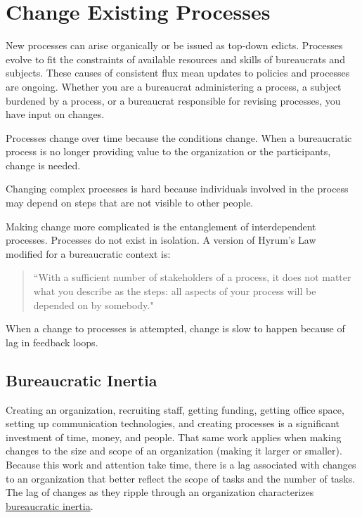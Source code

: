 \section{Change Existing Processes\label{sec:change-a-process}}

New processes can arise organically or be issued as top-down edicts. Processes evolve to fit the constraints of available resources and skills of bureaucrats and subjects. These causes of consistent flux mean updates to policies and processes are ongoing. Whether you are a bureaucrat administering a process, a subject burdened by a process, or a bureaucrat responsible for revising processes, you have input on changes.



Processes change over time because the conditions change. When a bureaucratic process is no longer providing value to the organization or the participants, change is needed. 

Changing complex processes is hard because individuals involved in the process may depend on steps that are not visible to other people.

Making change more complicated is the entanglement of interdependent processes. Processes do not exist in isolation. A version of Hyrum's Law~\cite{2017_Hyrum} 
modified for a bureaucratic context is:
\begin{quote}
``With a sufficient number of stakeholders of a process,
it does not matter what you describe as the steps:
all aspects of your process will be depended on by somebody."
\end{quote}


When  a change to processes is attempted, change is slow to happen because of lag in feedback loops. 

\subsection*{Bureaucratic Inertia}

Creating an organization, recruiting staff, getting funding, getting office space, setting up communication technologies, and creating processes is a significant investment of time, money, and people. 
That same work applies when making changes to the size and scope of an organization (making it larger or smaller). 
Because this work and attention take time, there is a lag associated with changes to an organization that better reflect the scope of tasks and the number of tasks. 
The lag of changes as they ripple through an organization characterizes \href{https://en.wikipedia.org/wiki/Bureaucratic_inertia}{bureaucratic inertia}. 

